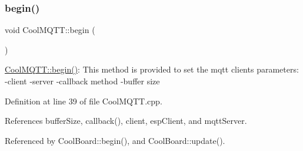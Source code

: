 \subsubsection{\texorpdfstring{begin()}{begin()}}
{\footnotesize\ttfamily void Cool\+M\+Q\+T\+T\+::begin (\begin{DoxyParamCaption}{ }\end{DoxyParamCaption})}

\hyperlink{classCoolMQTT_ac9248808641ebf3054ed0620ea9d0100}{Cool\+M\+Q\+T\+T\+::begin()}\+: This method is provided to set the mqtt client\textquotesingle{}s parameters\+: -\/client -\/server -\/callback method -\/buffer size 

Definition at line 39 of file Cool\+M\+Q\+T\+T.\+cpp.



References buffer\+Size, callback(), client, esp\+Client, and mqtt\+Server.



Referenced by Cool\+Board\+::begin(), and Cool\+Board\+::update().


